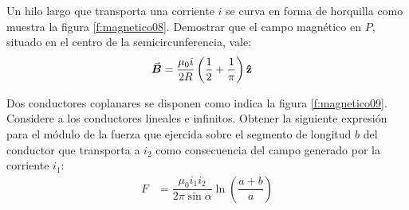 %
\begin{Exercise}\label{p:magnetico08}
    Un hilo largo que transporta una corriente $i$ se curva en forma de horquilla como muestra la figura \ref{f:magnetico08}. Demostrar que el campo magnético en $P$, situado en el centro de la semicircunferencia, vale:
    \begin{align*}
        \va*{B} &= \dfrac{\mu_0 i}{2R} \left ( \dfrac{1}{2} + \dfrac{1}{\pi} \right ) \vu{z}
    \end{align*}
\end{Exercise}
%
\noindent
\begin{minipage}[c]{0.5\textwidth}
\begin{Exercise}\label{p:magnetico09}
    Dos conductores coplanares se disponen como indica la figura \ref{f:magnetico09}. Considere a los conductores lineales e infinitos. Obtener la siguiente expresión para el módulo de la fuerza que ejercida sobre el segmento de longitud $b$ del conductor que transporta a $i_2$ como consecuencia del campo generado por la corriente $i_1$:
    \begin{align*}
        F &= \dfrac{\mu_0 i_1 i_2}{2\pi \sin\alpha} \ln \left ( \dfrac{a+b}{a}\right )
    \end{align*}
\end{Exercise}
\end{minipage}
%
